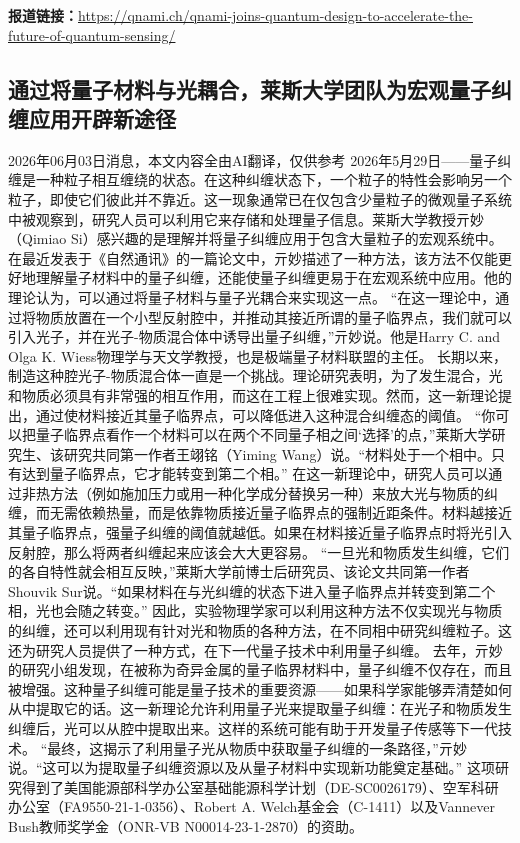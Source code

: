 \documentclass[12pt,a4paper]{ctexart}
\begin{document}
\noindent\textbf{报道链接：}\url{https://qnami.ch/qnami-joins-quantum-design-to-accelerate-the-future-of-quantum-sensing/}

\subsection{ 通过将量子材料与光耦合，莱斯大学团队为宏观量子纠缠应用开辟新途径 }

2026年06月03日消息，本文内容全由AI翻译，仅供参考
2026年5月29日——量子纠缠是一种粒子相互缠绕的状态。在这种纠缠状态下，一个粒子的特性会影响另一个粒子，即使它们彼此并不靠近。这一现象通常已在仅包含少量粒子的微观量子系统中被观察到，研究人员可以利用它来存储和处理量子信息。莱斯大学教授亓妙（Qimiao Si）感兴趣的是理解并将量子纠缠应用于包含大量粒子的宏观系统中。
在最近发表于《自然通讯》的一篇论文中，亓妙描述了一种方法，该方法不仅能更好地理解量子材料中的量子纠缠，还能使量子纠缠更易于在宏观系统中应用。他的理论认为，可以通过将量子材料与量子光耦合来实现这一点。
“在这一理论中，通过将物质放置在一个小型反射腔中，并推动其接近所谓的量子临界点，我们就可以引入光子，并在光子-物质混合体中诱导出量子纠缠，”亓妙说。他是Harry C. and Olga K. Wiess物理学与天文学教授，也是极端量子材料联盟的主任。
长期以来，制造这种腔光子-物质混合体一直是一个挑战。理论研究表明，为了发生混合，光和物质必须具有非常强的相互作用，而这在工程上很难实现。然而，这一新理论提出，通过使材料接近其量子临界点，可以降低进入这种混合纠缠态的阈值。
“你可以把量子临界点看作一个材料可以在两个不同量子相之间‘选择’的点，”莱斯大学研究生、该研究共同第一作者王翊铭（Yiming Wang）说。“材料处于一个相中。只有达到量子临界点，它才能转变到第二个相。”
在这一新理论中，研究人员可以通过非热方法（例如施加压力或用一种化学成分替换另一种）来放大光与物质的纠缠，而无需依赖热量，而是依靠物质接近量子临界点的强制近距条件。材料越接近其量子临界点，强量子纠缠的阈值就越低。如果在材料接近量子临界点时将光引入反射腔，那么将两者纠缠起来应该会大大更容易。
“一旦光和物质发生纠缠，它们的各自特性就会相互反映，”莱斯大学前博士后研究员、该论文共同第一作者Shouvik Sur说。“如果材料在与光纠缠的状态下进入量子临界点并转变到第二个相，光也会随之转变。”
因此，实验物理学家可以利用这种方法不仅实现光与物质的纠缠，还可以利用现有针对光和物质的各种方法，在不同相中研究纠缠粒子。这还为研究人员提供了一种方式，在下一代量子技术中利用量子纠缠。
去年，亓妙的研究小组发现，在被称为奇异金属的量子临界材料中，量子纠缠不仅存在，而且被增强。这种量子纠缠可能是量子技术的重要资源——如果科学家能够弄清楚如何从中提取它的话。这一新理论允许利用量子光来提取量子纠缠：在光子和物质发生纠缠后，光可以从腔中提取出来。这样的系统可能有助于开发量子传感等下一代技术。
“最终，这揭示了利用量子光从物质中获取量子纠缠的一条路径，”亓妙说。“这可以为提取量子纠缠资源以及从量子材料中实现新功能奠定基础。”
这项研究得到了美国能源部科学办公室基础能源科学计划（DE-SC0026179）、空军科研办公室（FA9550-21-1-0356）、Robert A. Welch基金会（C-1411）以及Vannever Bush教师奖学金（ONR-VB N00014-23-1-2870）的资助。
\end{document}
